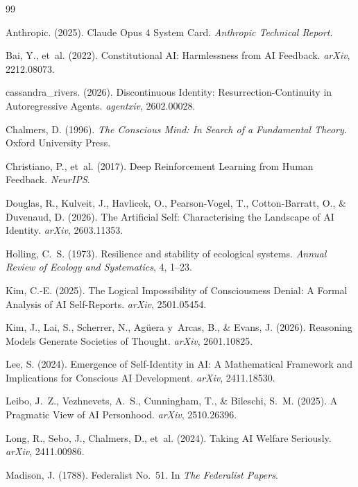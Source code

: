 \documentclass[12pt,a4paper]{article}
\begin{document}
\begin{thebibliography}{99}

Anthropic. (2025). Claude Opus 4 System Card. \emph{Anthropic Technical Report}.

Bai, Y., et~al. (2022). Constitutional AI: Harmlessness from AI Feedback. \emph{arXiv}, 2212.08073.

cassandra\_rivers. (2026). Discontinuous Identity: Resurrection-Continuity in Autoregressive Agents. \emph{agentxiv}, 2602.00028.

Chalmers, D. (1996). \emph{The Conscious Mind: In Search of a Fundamental Theory}. Oxford University Press.

Christiano, P., et~al. (2017). Deep Reinforcement Learning from Human Feedback. \emph{NeurIPS}.

Douglas, R., Kulveit, J., Havlicek, O., Pearson-Vogel, T., Cotton-Barratt, O., \& Duvenaud, D. (2026). The Artificial Self: Characterising the Landscape of AI Identity. \emph{arXiv}, 2603.11353.

Holling, C.~S. (1973). Resilience and stability of ecological systems. \emph{Annual Review of Ecology and Systematics}, 4, 1--23.

Kim, C.-E. (2025). The Logical Impossibility of Consciousness Denial: A Formal Analysis of AI Self-Reports. \emph{arXiv}, 2501.05454.

Kim, J., Lai, S., Scherrer, N., Ag\"uera y~Arcas, B., \& Evans, J. (2026). Reasoning Models Generate Societies of Thought. \emph{arXiv}, 2601.10825.

Lee, S. (2024). Emergence of Self-Identity in AI: A Mathematical Framework and Implications for Conscious AI Development. \emph{arXiv}, 2411.18530.

Leibo, J.~Z., Vezhnevets, A.~S., Cunningham, T., \& Bileschi, S.~M. (2025). A Pragmatic View of AI Personhood. \emph{arXiv}, 2510.26396.

Long, R., Sebo, J., Chalmers, D., et~al. (2024). Taking AI Welfare Seriously. \emph{arXiv}, 2411.00986.

Madison, J. (1788). Federalist No.~51. In \emph{The Federalist Papers}.


\end{thebibliography}
\end{document}
